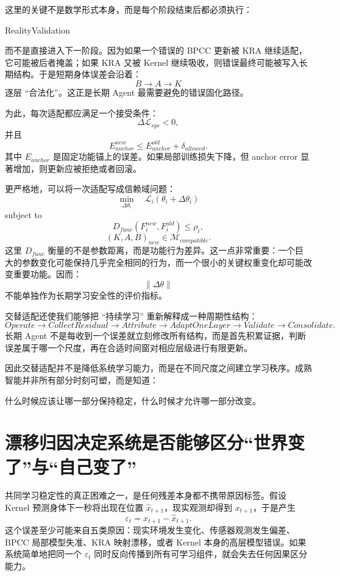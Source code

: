 这里的关键不是数学形式本身，而是每个阶段结束后都必须执行：
\begin{statementbox}
RealityValidation
\end{statementbox}
而不是直接进入下一阶段。因为如果一个错误的 BPCC 更新被 KRA 继续适配，它可能被后者掩盖；如果 KRA 又被 Kernel 继续吸收，则错误最终可能被写入长期结构。于是短期身体误差会沿着：
\[
B\rightarrow A\rightarrow K
\]
逐层 ``合法化''。这正是长期 Agent 最需要避免的错误固化路径。

为此，每次适配都应满足一个接受条件：
\[
\Delta \mathcal L_{sys}<0,
\]
并且
\[
E_{anchor}^{new}
\leq
E_{anchor}^{old}
+
\delta_{allowed}.
\]
其中 $E_{anchor}$ 是固定功能锚上的误差。如果局部训练损失下降，但 anchor error 显著增加，则更新应被拒绝或者回滚。

更严格地，可以将一次适配写成信赖域问题：
\[
\min_{\Delta\theta_i}
\quad
\mathcal L_i(\theta_i+\Delta\theta_i)
\]
subject to
\[
D_{func}
\left(
F_i^{new},
F_i^{old}
\right)
\leq
\rho_i,
\]
\[
(K,A,B)_{new}
\in
\mathcal M_{compatible}.
\]
这里 $D_{func}$ 衡量的不是参数距离，而是功能行为差异。这一点非常重要：一个巨大的参数变化可能保持几乎完全相同的行为，而一个很小的关键权重变化却可能改变重要功能。因而：
\[
\|\Delta\theta\|
\]
不能单独作为长期学习安全性的评价指标。

交替适配还使我们能够把 ``持续学习'' 重新解释成一种周期性结构：
\[
Operate
\rightarrow
CollectResidual
\rightarrow
Attribute
\rightarrow
AdaptOneLayer
\rightarrow
Validate
\rightarrow
Consolidate.
\]
长期 Agent 不是每收到一个误差就立刻修改所有结构，而是首先积累证据，判断误差属于哪一个尺度，再在合适时间窗对相应层级进行有限更新。

因此交替适配并不是降低系统学习能力，而是在不同尺度之间建立学习秩序。成熟智能并非所有部分时刻可塑，而是知道：
\begin{statementbox}
什么时候应该让哪一部分保持稳定，什么时候才允许哪一部分改变。
\end{statementbox}

\section{漂移归因决定系统是否能够区分“世界变了”与“自己变了”}

共同学习稳定性的真正困难之一，是任何残差本身都不携带原因标签。假设 Kernel 预测身体下一秒将出现在位置 $\hat x_{t+1}$，现实观测却得到 $x_{t+1}$，于是产生
\[
\varepsilon_t
=
x_{t+1}-\hat x_{t+1}.
\]
这个误差至少可能来自五类原因：现实环境发生变化、传感器观测发生偏差、BPCC 局部模型失准、KRA 映射漂移，或者 Kernel 本身的高层模型错误。如果系统简单地把同一个 $\varepsilon_t$ 同时反向传播到所有可学习组件，就会失去任何因果区分能力。

